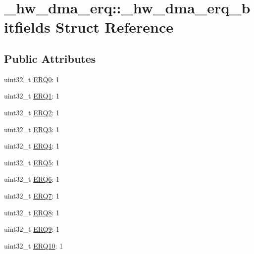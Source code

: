 \hypertarget{struct__hw__dma__erq_1_1__hw__dma__erq__bitfields}{}\section{\+\_\+hw\+\_\+dma\+\_\+erq\+:\+:\+\_\+hw\+\_\+dma\+\_\+erq\+\_\+bitfields Struct Reference}
\label{struct__hw__dma__erq_1_1__hw__dma__erq__bitfields}
\subsection*{Public Attributes}
\begin{DoxyCompactItemize}
\item 
uint32\+\_\+t \hyperlink{struct__hw__dma__erq_1_1__hw__dma__erq__bitfields_a04690414e631ebfbd7ef1670e1d95c09}{E\+R\+Q0}\+: 1
\item 
uint32\+\_\+t \hyperlink{struct__hw__dma__erq_1_1__hw__dma__erq__bitfields_a0ef08afef748444218d493a354b335ab}{E\+R\+Q1}\+: 1
\item 
uint32\+\_\+t \hyperlink{struct__hw__dma__erq_1_1__hw__dma__erq__bitfields_a5442afb50e035835248818ecd04a9bd2}{E\+R\+Q2}\+: 1
\item 
uint32\+\_\+t \hyperlink{struct__hw__dma__erq_1_1__hw__dma__erq__bitfields_aa2982400fe4022a08ec74c896503c4ca}{E\+R\+Q3}\+: 1
\item 
uint32\+\_\+t \hyperlink{struct__hw__dma__erq_1_1__hw__dma__erq__bitfields_a9c25549303149b10906baf69d9c6c858}{E\+R\+Q4}\+: 1
\item 
uint32\+\_\+t \hyperlink{struct__hw__dma__erq_1_1__hw__dma__erq__bitfields_aafefe64f85bfb504642ca871f8f55882}{E\+R\+Q5}\+: 1
\item 
uint32\+\_\+t \hyperlink{struct__hw__dma__erq_1_1__hw__dma__erq__bitfields_ab46dafeb621157283bba3a8ed9e3d39e}{E\+R\+Q6}\+: 1
\item 
uint32\+\_\+t \hyperlink{struct__hw__dma__erq_1_1__hw__dma__erq__bitfields_ac5a00ecba0476edad16745541f4d41ee}{E\+R\+Q7}\+: 1
\item 
uint32\+\_\+t \hyperlink{struct__hw__dma__erq_1_1__hw__dma__erq__bitfields_a43aab839ff7f95e479047142afea663a}{E\+R\+Q8}\+: 1
\item 
uint32\+\_\+t \hyperlink{struct__hw__dma__erq_1_1__hw__dma__erq__bitfields_abd0af288ccd1693d438a93531832ab58}{E\+R\+Q9}\+: 1
\item 
uint32\+\_\+t \hyperlink{struct__hw__dma__erq_1_1__hw__dma__erq__bitfields_ab2c84006592d7d6dd72746b5c1ed3fa4}{E\+R\+Q10}\+: 1

\end{DoxyCompactItemize}
